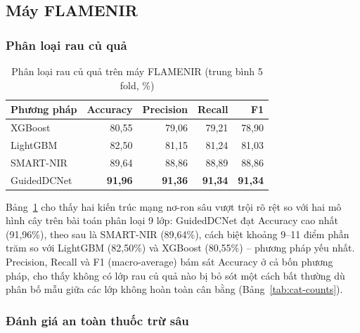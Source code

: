 \documentclass[10pt,twocolumn,twoside]{article}
\begin{document}
\subsection{Máy FLAMENIR}

\subsubsection{Phân loại rau củ quả}
\label{sec:results-flamenir-clf}

\begin{table}[htbp]
\centering
\caption{Phân loại rau củ quả trên máy FLAMENIR (trung bình 5 fold, \%)}
\label{tab:res-clf-flamenir}
\footnotesize
\begin{tabular}{|l|r|r|r|r|}
\hline
\textbf{Phương pháp} & \textbf{Accuracy} & \textbf{Precision} & \textbf{Recall} & \textbf{F1} \\
\hline
XGBoost     & 80,55 & 79,06 & 79,21 & 78,90 \\
LightGBM    & 82,50 & 81,15 & 81,24 & 81,03 \\
SMART-NIR   & 89,64 & 88,86 & 88,89 & 88,86 \\
GuidedDCNet & \textbf{91,96} & \textbf{91,36} & \textbf{91,34} & \textbf{91,34} \\
\hline
\end{tabular}
\end{table}

Bảng~\ref{tab:res-clf-flamenir} cho thấy hai kiến trúc mạng nơ-ron sâu vượt
trội rõ rệt so với hai mô hình cây trên bài toán phân loại 9 lớp:
GuidedDCNet đạt Accuracy cao nhất (91,96\%), theo sau là SMART-NIR
(89,64\%), cách biệt khoảng 9--11 điểm phần trăm so với LightGBM (82,50\%)
và XGBoost (80,55\%) -- phương pháp yếu nhất. Precision, Recall và F1
(macro-average) bám sát Accuracy ở cả bốn phương pháp, cho thấy không có
lớp rau củ quả nào bị bỏ sót một cách bất thường dù phân bố mẫu giữa các
lớp không hoàn toàn cân bằng (Bảng~\ref{tab:cat-counts}).

\subsubsection{Đánh giá an toàn thuốc trừ sâu}
\label{sec:results-flamenir-safety}
\end{document}
